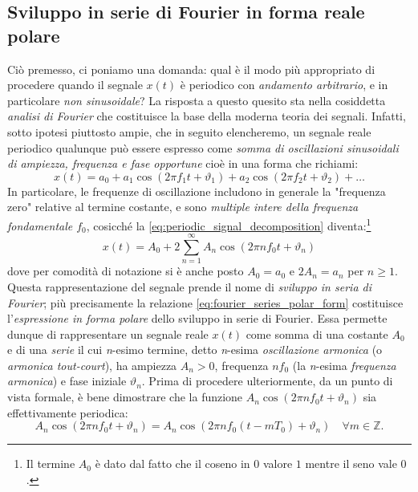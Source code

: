 \documentclass[12pt,oneside,openany]{memoir}
\numberwithin{equation}{subsection}
\begin{document}
\subsection{Sviluppo in serie di Fourier in forma reale polare}
Ci\`o premesso, ci poniamo una domanda: qual \`e il modo pi\`u appropriato di procedere quando il segnale $x(t)$ \`e periodico con \textit{andamento arbitrario}, e in particolare \textit{non sinusoidale}? La risposta a questo quesito sta nella cosiddetta \textit{analisi di Fourier} che costituisce la base della moderna teoria dei segnali. Infatti, sotto ipotesi piuttosto ampie, che in seguito elencheremo, un segnale reale periodico qualunque pu\`o essere espresso come \textit{somma di oscillazioni sinusoidali di ampiezza, frequenza e fase opportune} cio\`e in una forma che richiami:
\begin{equation}\label{eq:periodic_signal_decomposition}
	x(t) = a_0 + a_1 \cos(2 \pi f_1 t + \vartheta_1) + a_2 \cos(2 \pi f_2 t + \vartheta_2) + \dots
\end{equation}
In particolare, le frequenze di oscillazione includono in generale la "frequenza zero" relative al termine costante, e sono \textit{multiple intere della frequenza fondamentale $f_0$}, cosicch\'e la \eqref{eq:periodic_signal_decomposition} diventa:\footnote{Il termine $A_0$ \`e dato dal fatto che il coseno in $0$ valore $1$ mentre il seno vale $0$.}
\begin{equation}\label{eq:fourier_series_polar_form}
	x(t) = A_0 + 2 \sum_{n = 1}^{\infty} A_n \cos(2 \pi n f_0 t + \vartheta_n)
\end{equation}
dove per comodit\`a di notazione si \`e anche posto $A_0 = a_0$ e $2A_n = a_n$ per $n \geq 1$. Questa rappresentazione del segnale prende il nome di \textit{sviluppo in seria di Fourier}; pi\`u precisamente la relazione \eqref{eq:fourier_series_polar_form} costituisce l'\textit{espressione in forma polare} dello sviluppo in serie di Fourier. Essa permette dunque di rappresentare un segnale reale $x(t)$ come somma di una costante $A_0$ e di una \textit{serie} il cui \textit{n}-esimo termine, detto \textit{n}-esima \textit{oscillazione armonica} (o \textit{armonica tout-court}), ha ampiezza $A_n > 0$, frequenza $nf_0$ (la \textit{n}-esima \textit{frequenza armonica}) e fase iniziale $\vartheta_n$.
\bigbreak
Prima di procedere ulteriormente, da un punto di vista formale, \`e bene dimostrare che la funzione $A_n \cos(2 \pi n f_0 t + \vartheta_n)$ sia effettivamente periodica:
\[
	A_n \cos(2 \pi n f_0 t + \vartheta_n) = A_n \cos(2 \pi n f_0 (t - mT_0) + \vartheta_n) \quad \forall m \in \mathbb{Z}.
\]
\end{document}
